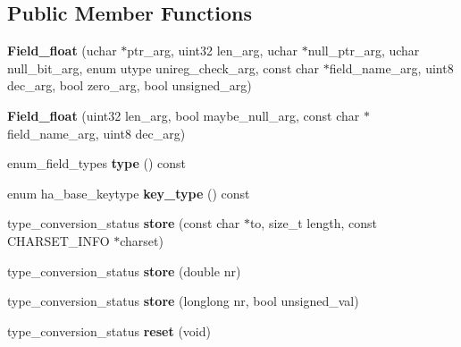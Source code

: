 \subsection*{Public Member Functions}
\begin{DoxyCompactItemize}
\item 
\mbox{\label{classField__float_a79adfda86e44895dc875e11b8778b38d}} 
{\bfseries Field\+\_\+float} (uchar $\ast$ptr\+\_\+arg, uint32 len\+\_\+arg, uchar $\ast$null\+\_\+ptr\+\_\+arg, uchar null\+\_\+bit\+\_\+arg, enum utype unireg\+\_\+check\+\_\+arg, const char $\ast$field\+\_\+name\+\_\+arg, uint8 dec\+\_\+arg, bool zero\+\_\+arg, bool unsigned\+\_\+arg)
\item 
\mbox{\label{classField__float_a667bf9489d37864ddc759964cf0c6030}} 
{\bfseries Field\+\_\+float} (uint32 len\+\_\+arg, bool maybe\+\_\+null\+\_\+arg, const char $\ast$field\+\_\+name\+\_\+arg, uint8 dec\+\_\+arg)
\item 
\mbox{\label{classField__float_a6804cd7beb090e25a31f768185e5e2f7}} 
enum\+\_\+field\+\_\+types {\bfseries type} () const
\item 
\mbox{\label{classField__float_a669de0e32eb990fc0efeca22f3c71c03}} 
enum ha\+\_\+base\+\_\+keytype {\bfseries key\+\_\+type} () const
\item 
\mbox{\label{classField__float_a4a903290d6557cb8b37d6157bc879fcb}} 
type\+\_\+conversion\+\_\+status {\bfseries store} (const char $\ast$to, size\+\_\+t length, const C\+H\+A\+R\+S\+E\+T\+\_\+\+I\+N\+FO $\ast$charset)
\item 
\mbox{\label{classField__float_aea1189015d3ef36ce9f8fae921d77841}} 
type\+\_\+conversion\+\_\+status {\bfseries store} (double nr)
\item 
\mbox{\label{classField__float_a35fc625069d868d2418e014b68264bdf}} 
type\+\_\+conversion\+\_\+status {\bfseries store} (longlong nr, bool unsigned\+\_\+val)
\item 
\mbox{\label{classField__float_ab430492702b3e6d13e625fd3eaf2ff4b}} 
type\+\_\+conversion\+\_\+status {\bfseries reset} (void)

\end{DoxyCompactItemize}
